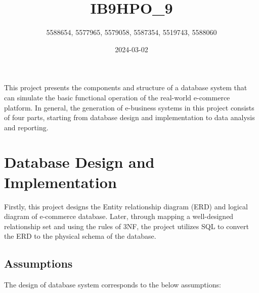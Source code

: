 \documentclass[
  letterpaper,
  DIV=11,
  numbers=noendperiod]{scrartcl}
\title{IB9HPO\_9}
\author{5588654, 5577965, 5579058, 5587354, 5519743, 5588060}
\date{2024-03-02}
\begin{document}
\maketitle
\ifdefined\Shaded\renewenvironment{Shaded}{\begin{tcolorbox}[sharp corners, breakable, frame hidden, interior hidden, boxrule=0pt, borderline west={3pt}{0pt}{shadecolor}, enhanced]}{\end{tcolorbox}}\fi

This project presents the components and structure of a database system
that can simulate the basic functional operation of the real-world
e-commerce platform. In general, the generation of e-business systems in
this project consists of four parts, starting from database design and
implementation to data analysis and reporting.

\hypertarget{database-design-and-implementation}{%
\section{Database Design and
Implementation}\label{database-design-and-implementation}}

Firstly, this project designs the Entity relationship diagram (ERD) and
logical diagram of e-commerce database. Later, through mapping a
well-designed relationship set and using the rules of 3NF, the project
utilizes SQL to convert the ERD to the physical schema of the database.

\hypertarget{assumptions}{%
\subsection{Assumptions}\label{assumptions}}

The design of database system corresponds to the below assumptions:
\end{document}
